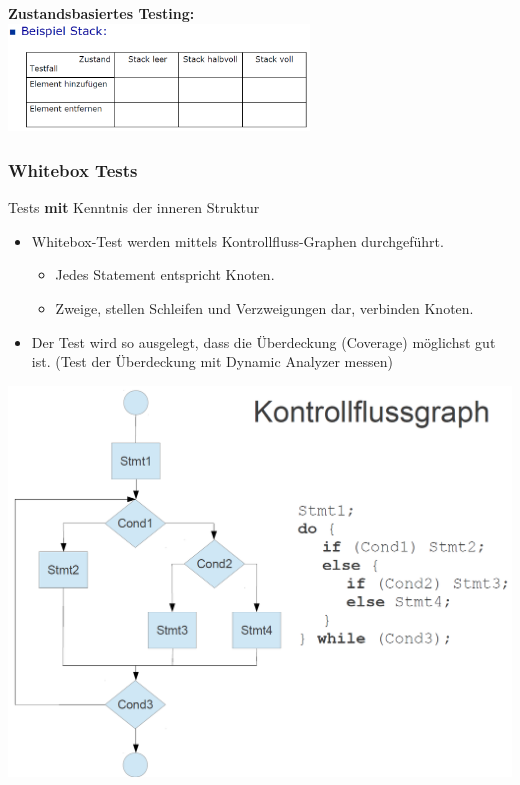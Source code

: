 \textbf{Zustandsbasiertes Testing:} \\
\includegraphics[width = 8cm]{images/stack}
\clearpage
\pagebreak
\subsubsection{Whitebox Tests}
\begin{minipage}{9cm}
    Tests \textbf{mit} Kenntnis der inneren Struktur\\
    
    \begin{itemize}
    \item Whitebox-Test werden mittels Kontrollfluss-Graphen durchgeführt.
    \begin{itemize}
    	\item Jedes Statement entspricht Knoten.
    	\item Zweige, stellen Schleifen und Verzweigungen dar, verbinden Knoten.
    \end{itemize}
    \item Der Test wird so ausgelegt, dass die Überdeckung (Coverage) möglichst gut ist. (Test der Überdeckung mit Dynamic Analyzer messen)
    \end{itemize}
\end{minipage}
\hspace{0.5cm}
\begin{minipage}{7.5cm}
	\includegraphics[width=\linewidth]{images/kontrollflussgraphen.png}
\end{minipage}

